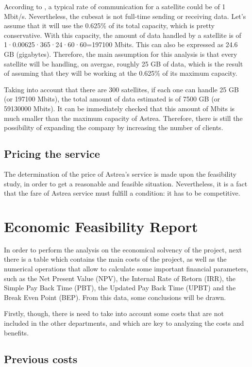 According to \cite{GomSpace2016}, a typical rate of communication for a satellite could be of 1 Mbit/s. Nevertheless, the cubesat is not full-time sending or receiving data. Let's assume that it will use the 0.625\% of its total capacity, which is pretty conservative. With this capacity, the amount of data handled by a satellite is of 1·0.00625·365·24·60·60=197100 Mbits. This can also be expressed as 24.6 GB (gigabytes). Therefore, the main assumption for this analysis is that every satellite will be handling, on avergae, roughly 25 GB of data, which is the result of assuming that they will be working at the 0.625\% of its maximum capacity. 

Taking into account that there are 300 satellites, if each one can handle 25 GB (or 197100 Mbits), the total amount of data estimated is of 7500 GB (or 59130000 Mbits). It can be immediately checked that this amount of Mbits is much smaller than the maximum capacity of Astrea. Therefore, there is still the possibility of expanding the company by increasing the number of clients.  

\subsection{Pricing the service}
The determination of the price of Astrea's service is made upon the feasibility study, in order to get a reasonable and feasible situation. Nevertheless, it is a fact that the fare of Astrea service must fulfill a condition: it has to be competitive. 

\section{Economic Feasibility Report}

In order to perform the analysis on the economical solvency of the project, next there is a table which contains the main costs of the project, as well as the numerical operations that allow to calculate some important financial parameters, such as the Net Present Value (NPV), the Internal Rate of Retorn (IRR), the Simple Pay Back Time (PBT), the Updated Pay Back Time (UPBT) and the Break Even Point (BEP). From this data, some conclusions will be drawn.

Firstly, though, there is need to take into account some costs that are not included in the other departments, and which are key to analyzing the costs and benefits. 

\subsection{Previous costs}
